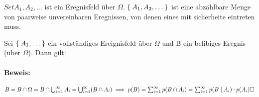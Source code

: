 \documentclass{../tudscript}
\begin{document}
$Set{A_1, A_2, \ldots}$ ist ein Eregnisfeld über $\Omega$. $\Set{A_1, A_2, \ldots}$ ist eine abzählbare Menge von paarweise unvereinbaren Eregnissen, von denen eines mit sicherheite eintreten muss.


Sei $\Set{A_1, \ldots}$ ein vollständiges Ereignisfeld über $\Omega$ und B ein belibiges Eregnis (über $\Omega$).
Dann gilt:

\paragraph{Beweis:}

$B = B \cap \Omega = B \cap \bigcup_{i =1}^\infty A_i = \bigcup_{i=1}^\infty (B \cap A_i) \implies
p(B) = \sum_{i =1}^\infty p(B \cap A_i) = \sum_{i =1}^\infty p(B\mid A_i) \cdot p(A_i)\hfill\square$
\end{document}
